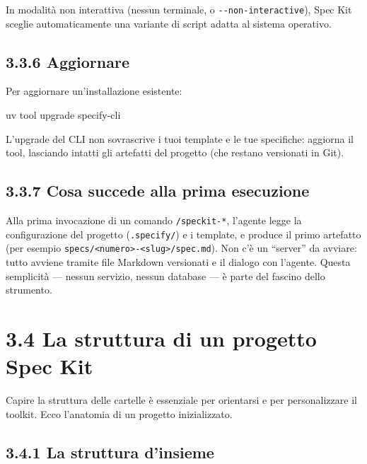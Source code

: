 \documentclass[
  italian,
  10pt,
]{book}
\newenvironment{Shaded}{\begin{snugshade}}{\end{snugshade}}
\newcommand{\ExtensionTok}[1]{#1}
\newcommand{\NormalTok}[1]{#1}
\begin{document}
In modalità non interattiva (nessun terminale, o
\texttt{-\/-non-interactive}), Spec Kit sceglie automaticamente una
variante di script adatta al sistema operativo.

\subsection{3.3.6 Aggiornare}\label{aggiornare}

Per aggiornare un'installazione esistente:

\begin{Shaded}
\begin{Highlighting}[]
\ExtensionTok{uv}\NormalTok{ tool upgrade specify{-}cli}
\end{Highlighting}
\end{Shaded}

L'upgrade del CLI non sovrascrive i tuoi template e le tue specifiche:
aggiorna il tool, lasciando intatti gli artefatti del progetto (che
restano versionati in Git).

\subsection{3.3.7 Cosa succede alla prima
esecuzione}\label{cosa-succede-alla-prima-esecuzione}

Alla prima invocazione di un comando \texttt{/speckit-*}, l'agente legge
la configurazione del progetto (\texttt{.specify/}) e i template, e
produce il primo artefatto (per esempio
\texttt{specs/\textless{}numero\textgreater{}-\textless{}slug\textgreater{}/spec.md}).
Non c'è un ``server'' da avviare: tutto avviene tramite file Markdown
versionati e il dialogo con l'agente. Questa semplicità --- nessun
servizio, nessun database --- è parte del fascino dello strumento.

\section{3.4 La struttura di un progetto Spec
Kit}\label{la-struttura-di-un-progetto-spec-kit}

Capire la struttura delle cartelle è essenziale per orientarsi e per
personalizzare il toolkit. Ecco l'anatomia di un progetto inizializzato.

\subsection{3.4.1 La struttura d'insieme}\label{la-struttura-dinsieme}
\end{document}
